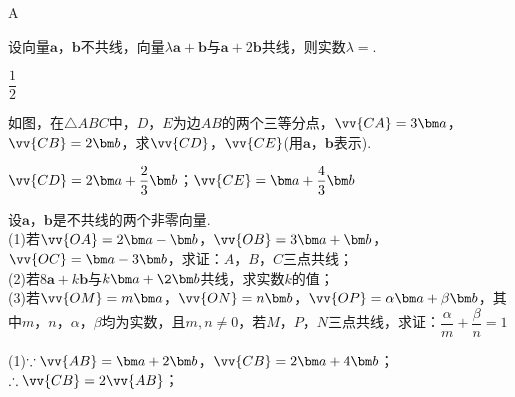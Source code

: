 \begin{exercise}
\begin{minipage}[htbp!]{0.3\linewidth}
\begin{center}
      \end{center}
  \end{minipage}
    \begin{answer}
      A
    \end{answer}
  \item
    设向量$\bm a$，$\bm b$不共线，向量$\lambda\bm a+\bm b$与$\bm a+2\bm b$共线，则实数$\lambda=$\tk.
    \begin{answer}
      $\dfrac12$
    \end{answer}
  \item
    如图，在$\triangle ABC$中，$D$，$E$为边$AB$的两个三等分点，$\vv{CA}=3\bm a$，$\vv{CB}=2\bm b$，求$\vv{CD}$，$\vv{CE}$(用$\bm a$，$\bm b$表示).
    \begin{flushright}
    \end{flushright}
    \begin{answer}
      $\vv{CD}=2\bm a+\dfrac23\bm b$；$\vv{CE}=\bm a+\dfrac43\bm b$
    \end{answer}
  \item
    设$\bm a$，$\bm b$是不共线的两个非零向量.\\
    (1)若$\vv{OA}=2\bm a-\bm b$，$\vv{OB}=3\bm a+\bm b$，$\vv{OC}=\bm a-3\bm b$，求证：$A$，$B$，$C$三点共线；\\
    (2)若$8\bm a+k\bm b$与$k\bm a+\2\bm b$共线，求实数$k$的值；\\
    (3)若$\vv{OM}=m\bm a$，$\vv{ON}=n\bm b$，$\vv{OP}=\alpha\bm a+\beta\bm b$，其中$m$，$n$，$\alpha$，$\beta$均为实数，且$m,n\neq 0$，若$M$，$P$，$N$三点共线，求证：$\dfrac{\alpha}m+\dfrac{\beta}n=1$
    \begin{answer}
      (1)$\because \vv{AB}=\bm a+2\bm b$，$\vv{CB}=2\bm a+4\bm b$；$\therefore \vv{CB}=2\vv{AB}$；\\

\end{answer}
\end{exercise}
